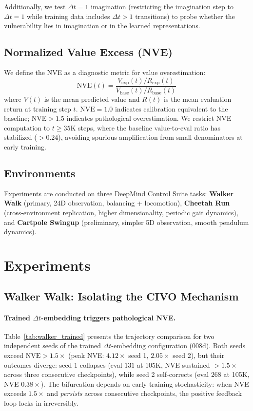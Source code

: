 \documentclass[10pt,letterpaper]{article}
\newcommand{\dt}{\Delta t}
\newcommand{\nve}{\mathrm{NVE}}
\begin{document}
Additionally, we test $\dt{=}1$ imagination (restricting the imagination step to $\dt{=}1$ while training data includes $\dt{>}1$ transitions) to probe whether the vulnerability lies in imagination or in the learned representations.

\subsection{Normalized Value Excess (NVE)}

We define the NVE as a diagnostic metric for value overestimation:
\begin{equation}
  \nve(t) = \frac{V_{\mathrm{exp}}(t) / R_{\mathrm{exp}}(t)}{V_{\mathrm{base}}(t) / R_{\mathrm{base}}(t)}
\end{equation}
where $V(t)$ is the mean predicted value and $R(t)$ is the mean evaluation return at training step $t$.
$\nve = 1.0$ indicates calibration equivalent to the baseline; $\nve > 1.5$ indicates pathological overestimation.
We restrict NVE computation to $t \geq 35$K steps, where the baseline value-to-eval ratio has stabilized ($> 0.24$), avoiding spurious amplification from small denominators at early training.

\subsection{Environments}

Experiments are conducted on three DeepMind Control Suite tasks:
\textbf{Walker Walk} (primary, 24D observation, balancing + locomotion),
\textbf{Cheetah Run} (cross-environment replication, higher dimensionality, periodic gait dynamics), and
\textbf{Cartpole Swingup} (preliminary, simpler 5D observation, smooth pendulum dynamics).

\section{Experiments}

\subsection{Walker Walk: Isolating the CIVO Mechanism}
\label{sec:walker}

\paragraph{Trained $\dt$-embedding triggers pathological NVE.}
Table~\ref{tab:walker_trained} presents the trajectory comparison for two independent seeds of the trained $\dt$-embedding configuration (008d).
Both seeds exceed $\nve > 1.5\times$ (peak NVE: $4.12\times$ seed 1, $2.05\times$ seed 2), but their outcomes diverge: seed 1 collapses (eval $131$ at 105K, NVE sustained $> 1.5\times$ across three consecutive checkpoints), while seed 2 self-corrects (eval $268$ at 105K, NVE $0.38\times$).
The bifurcation depends on early training stochasticity: when NVE exceeds $1.5\times$ and \emph{persists} across consecutive checkpoints, the positive feedback loop locks in irreversibly.
\end{document}

